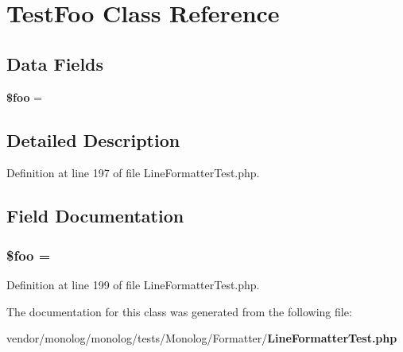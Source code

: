 \section{Test\+Foo Class Reference}
\label{class_monolog_1_1_formatter_1_1_test_foo}
\subsection*{Data Fields}
\begin{DoxyCompactItemize}
\item 
{\bf \$foo} = \textquotesingle{}
\end{DoxyCompactItemize}


\subsection{Detailed Description}


Definition at line 197 of file Line\+Formatter\+Test.\+php.



\subsection{Field Documentation}
\subsubsection[{\$foo}]{\setlength{\rightskip}{0pt plus 5cm}\${\bf foo} = \textquotesingle{}}\label{class_monolog_1_1_formatter_1_1_test_foo_a7a1efa8a0f6183fb3a5e8e8b0696526c}


Definition at line 199 of file Line\+Formatter\+Test.\+php.



The documentation for this class was generated from the following file\+:\begin{DoxyCompactItemize}
\item 
vendor/monolog/monolog/tests/\+Monolog/\+Formatter/{\bf Line\+Formatter\+Test.\+php}\end{DoxyCompactItemize}
